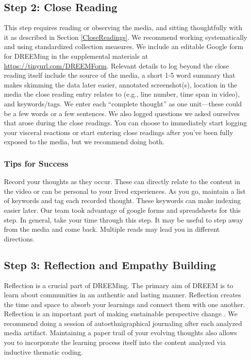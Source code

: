 \subsection{Step 2: Close Reading}
This step requires reading or observing the media, and sitting thoughtfully with it as described in Section \ref{CloseReadings}. We recommend working systematically and using standardized collection measures. We include an editable Google form for DREEMing in the supplemental materials at \url{https://tinyurl.com/DREEMForm}. Relevant details to log beyond the close reading itself include the source of the media, a short 1-5 word summary that makes skimming the data later easier, annotated screenshot(s), location in the media the close reading entry relates to (e.g., line number, time span in video), and keywords/tags. We enter each ``complete thought'' as one unit—these could be a few words or a few sentences. We also logged questions we asked ourselves that arose during the close readings. You can choose to immediately start logging your visceral reactions or start entering close readings after you've been fully exposed to the media, but we recommend doing both.

\subsubsection{Tips for Success}
Record your thoughts as they occur. These can directly relate to the content in the video or can be personal to your lived experiences. As you go, maintain a list of keywords and tag each recorded thought. These keywords can make indexing easier later. Our team took advantage of google forms and spreadsheets for this step. In general, take your time through this step. It may be useful to step away from the media and come back. Multiple reads may lead you in different directions. 

\subsection{Step 3: Reflection and Empathy Building}
Reflection is a crucial part of DREEMing. The primary aim of DREEM is to learn about communities in an authentic and lasting manner. Reflection creates the time and space to absorb your learnings and connect them with one another. Reflection is an important part of making sustainable perspective change \cite{lyubomirskyPursuingHappinessArchitecture2005}. We recommend doing a session of autoethnigraphical journaling after each analyzed media artifact. 
Maintaining a paper trail of your evolving thoughts also allows you to incorporate the learning process itself into the content analyzed via inductive thematic coding. 

